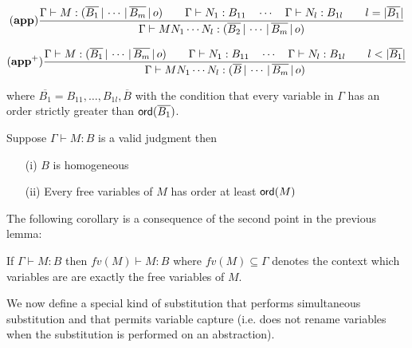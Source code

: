 $$ \mathbf{(app)} {{{{\Gamma} \vdash {M : (\overline{B_1} \, | \, \cdots \, | \, \overline{B_m} \, | \, o)}} \qquad
{{\Gamma} \vdash {N_1 : B_{11}}} \quad \cdots \quad {{\Gamma} \vdash {N_{l} :
B_{1l}}} \qquad l = |\overline{B_1}| } \over{ {{\Gamma} \vdash {M N_1
\cdots N_{l} : (\overline{B_2} \, | \, \cdots \, | \,
\overline{B_m} \, | \, o)}}}} $$


$$ \mathbf{(app^+)} {{{{\Gamma} \vdash {M : (\overline{B_1} \, | \, \cdots \, | \, \overline{B_m} \, | \, o)}} \qquad
{{\Gamma} \vdash {N_1 : B_{11}}} \quad \cdots \quad {{\Gamma} \vdash {N_{l} :
B_{1l}}} \qquad l < |\overline{B_1}| } \over{ {{\Gamma} \vdash {M N_1
\cdots N_{l} : (\overline{B} \, | \, \cdots \, | \,
\overline{B_m} \, | \, o)}}}} $$

where $\overline{B_1} = B_{11}, \ldots, B_{1l},\overline{B}$ with
the condition that every variable in $\Gamma$ has an order strictly greater
than ${\sf ord}(\overline{B_1})$.


\begin{lem}
\label{lem:safe_basic_prop} Suppose $\Gamma \vdash M : B$ is a
valid judgment then

\begin{itemize}
\item[(i)] $B$ is homogeneous
\item[(ii)] Every free variables of $M$ has order at least ${\sf ord}(M)$
\end{itemize}
\end{lem}

The following corollary is a consequence of the second point in the previous lemma:
\begin{property}
If $\Gamma \vdash M : B$ then $fv(M) \vdash M : B$ where $fv(M) \subseteq \Gamma$ denotes the context which variables are
are exactly the free variables of $M$.
\end{property}

We now define a special kind of substitution that performs simultaneous substitution and
that permits variable capture (i.e. does not rename variables when the substitution is performed on an abstraction).

